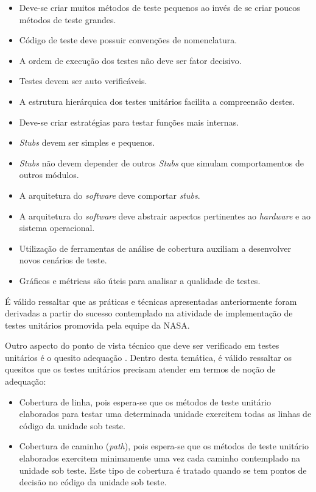 \begin{itemize}
	\item Deve-se criar muitos métodos de teste pequenos ao invés de se criar poucos métodos de teste grandes.
	\item Código de teste deve possuir convenções de nomenclatura.
	\item A ordem de execução dos testes não deve ser fator decisivo.
	\item Testes devem ser auto verificáveis.
	\item A estrutura hierárquica dos testes unitários facilita a compreensão destes.
	\item Deve-se criar estratégias para testar funções mais internas.
	\item \textit{Stubs} devem ser simples e pequenos.
	\item \textit{Stubs} não devem depender de outros \textit{Stubs} que simulam comportamentos de outros módulos.
	\item A arquitetura do \textit{software} deve comportar \textit{stubs}.
	\item A arquitetura do \textit{software} deve abstrair aspectos pertinentes ao \textit{hardware} e ao sistema operacional.
	\item Utilização de ferramentas de análise de cobertura auxiliam a desenvolver novos cenários de teste.
	\item Gráficos e métricas são úteis para analisar a qualidade de testes.
\end{itemize}

É válido ressaltar que as práticas e técnicas apresentadas anteriormente foram derivadas a partir do sucesso contemplado na atividade de implementação de testes unitários promovida pela equipe da NASA.

Outro aspecto do ponto de vista técnico que deve ser verificado em testes unitários é o quesito adequação \cite{adequacao}. Dentro desta temática, é válido ressaltar os quesitos que os testes unitários precisam atender em termos de noção de adequação:

\begin{itemize}
	\item Cobertura de linha, pois espera-se que os métodos de teste unitário elaborados para testar uma determinada unidade exercitem todas as linhas de código da unidade sob teste.
	\item Cobertura de caminho (\textit{path}), pois espera-se que os métodos de teste unitário elaborados exercitem minimamente uma vez cada caminho contemplado na unidade sob teste. Este tipo de cobertura é tratado quando se tem pontos de decisão no código da unidade sob teste.
\end{itemize}

